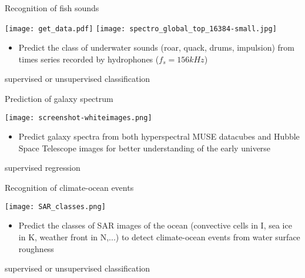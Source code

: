 \message{ !name(intro.tex)}\documentclass[pressentation,9pt,aspectratio=1610,xcolor=table]{beamer}
\newcommand{\doigt}{\noindent \Pisymbol{pzd}{43}}
\begin{document}
\begin{frame}{Recognition of fish sounds}

  \begin{center}
    \texttt{[image: get\_data.pdf]}
    \texttt{[image: spectro\_global\_top\_16384-small.jpg]}
  \end{center}
  \begin{itemize}
  \item[\doigt] Predict the class of underwater sounds (roar, quack, drums, impulsion) from  times series recorded by hydrophones ($f_s=156kHz$)
  \end{itemize}

  \begin{center}
    \alert{supervised or unsupervised classification}
  \end{center}
  
\end{frame}

\begin{frame}{Prediction of galaxy spectrum}

  \begin{center}
    \texttt{[image: screenshot-whiteimages.png]} \\
  \end{center}
  \begin{itemize}
  \item[\doigt] Predict galaxy spectra from both hyperspectral MUSE datacubes and Hubble Space Telescope images for better understanding of the early universe
  \end{itemize}
  \begin{center}
    \alert{supervised regression}
  \end{center}
\end{frame}

\begin{frame}{Recognition of climate-ocean events}

  \begin{center}
    \texttt{[image: SAR\_classes.png]}
  \end{center}
  \begin{itemize}
  \item[\doigt] Predict the classes of SAR images  of the ocean (convective cells in I, sea ice in K, weather front in N,...) to detect
    climate-ocean events from water surface roughness 
  \end{itemize}
  
  \begin{center}
    \alert{supervised or unsupervised classification}
  \end{center}
  
\end{frame}
\end{document}
